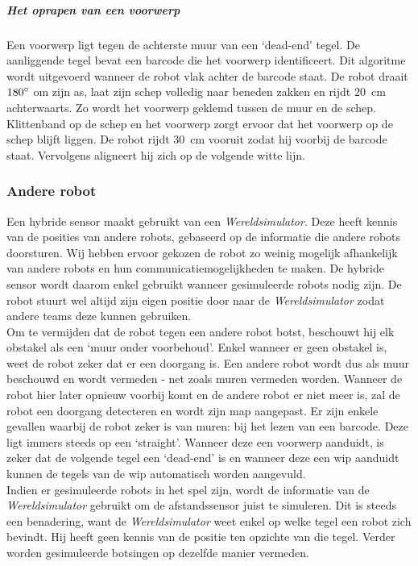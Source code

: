 \documentclass[eind]{penoverslag}
\begin{document}
\subparagraph{Het oprapen van een voorwerp}
Een voorwerp ligt tegen de achterste muur van een `dead-end' tegel. De aanliggende tegel bevat een barcode die het voorwerp identificeert. Dit algoritme wordt uitgevoerd wanneer de robot vlak achter de barcode staat. De robot draait $180\degree$ om zijn as, laat zijn schep volledig naar beneden zakken en rijdt $20$~cm achterwaarts. Zo wordt het voorwerp geklemd tussen de muur en de schep. Klittenband op de schep en het voorwerp zorgt ervoor dat het voorwerp op de schep blijft liggen. De robot rijdt $30$~cm vooruit zodat hij voorbij de barcode staat. Vervolgens aligneert hij zich op de volgende witte lijn.

\subsubsection{Andere robot}
\label{sssec:AlgoCollision}
Een hybride sensor maakt gebruikt van een \textit{Wereldsimulator}. Deze heeft kennis van de posities van andere robots, gebaseerd op de informatie die andere robots doorsturen. Wij hebben ervoor gekozen de robot zo weinig mogelijk afhankelijk van andere robots en hun communicatiemogelijkheden te maken. De hybride sensor wordt daarom enkel gebruikt wanneer gesimuleerde robots nodig zijn. De robot stuurt wel altijd zijn eigen positie door naar de \textit{Wereldsimulator} zodat andere teams deze kunnen gebruiken.\\

Om te vermijden dat de robot tegen een andere robot botst, beschouwt hij elk obstakel als een `muur onder voorbehoud'. Enkel wanneer er geen obstakel is, weet de robot zeker dat er een doorgang is. Een andere robot wordt dus als muur beschouwd en wordt vermeden - net zoals muren vermeden worden. Wanneer de robot hier later opnieuw voorbij komt en de andere robot er niet meer is, zal de robot een doorgang detecteren en wordt zijn map aangepast. Er zijn enkele gevallen waarbij de robot zeker is van muren: bij het lezen van een barcode. Deze ligt immers steeds op een `straight'. Wanneer deze een voorwerp aanduidt, is zeker dat de volgende tegel een `dead-end' is en wanneer deze een wip aanduidt kunnen de tegels van de wip automatisch worden aangevuld. \\

Indien er gesimuleerde robots in het spel zijn, wordt de informatie van de \textit{Wereldsimulator} gebruikt om de afstandssensor juist te simuleren. Dit is steeds een benadering, want de \textit{Wereldsimulator} weet enkel op welke tegel een robot zich bevindt. Hij heeft geen kennis van de positie ten opzichte van die tegel. Verder worden gesimuleerde botsingen op dezelfde manier vermeden.\\
\end{document}
